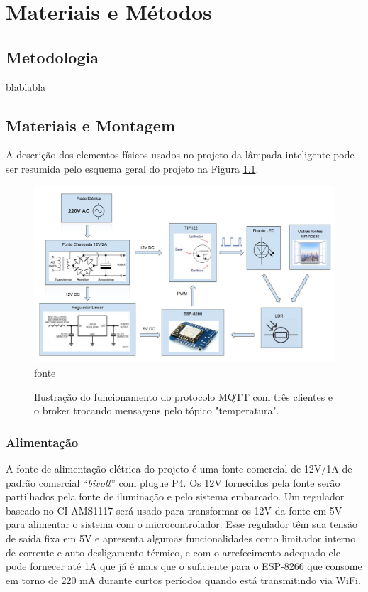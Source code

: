 \chapter{Materiais e Métodos}

\section{Metodologia}
blablabla

\section{Materiais e Montagem}

A descrição dos elementos físicos usados no projeto da lâmpada inteligente pode ser resumida pelo esquema geral do projeto na Figura \ref{esquema}.

\begin{figure}[ht]
    \begin{center}
    \caption[Esquema geral do projeto da fita de LED MQTT.]{Ilustração do funcionamento do protocolo MQTT com três clientes e o broker trocando mensagens pelo tópico "temperatura".}
    \includegraphics[width=\textwidth]{figuras/esquema_eletrico.jpg}
    fonte
    \end{center}
    
    \label{esquema}
\end{figure}

\subsection{Alimentação}

A fonte de alimentação elétrica do projeto é uma fonte comercial de 12V/1A de padrão comercial “\textit{bivolt}” com plugue P4. Os 12V fornecidos pela fonte serão partilhados pela fonte de iluminação e pelo sistema embarcado. Um regulador baseado no CI AMS1117 será usado para transformar os 12V da fonte em 5V para alimentar o sistema com o microcontrolador. Esse regulador têm sua tensão de saída fixa em 5V e apresenta algumas funcionalidades como limitador interno de corrente e auto-desligamento térmico, e com o arrefecimento adequado ele pode fornecer até 1A que já é mais que o suficiente para o ESP-8266 que consome em torno de 220 mA durante curtos períodos quando está transmitindo via WiFi.

